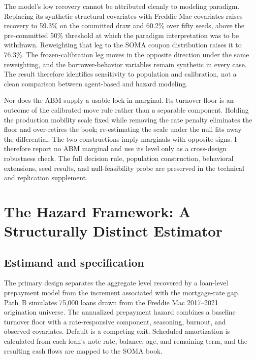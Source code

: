 \documentclass[12pt]{article}
\begin{document}
The model's low recovery cannot be attributed cleanly to modeling paradigm.
Replacing its synthetic structural covariates with Freddie Mac covariates raises
recovery to 59.3\% on the committed draw and 60.2\% over fifty seeds, above the
pre-committed 50\% threshold at which the paradigm interpretation was to be
withdrawn. Reweighting that leg to the SOMA coupon distribution raises it to
76.3\%. The frozen-calibration leg moves in the opposite direction under the
same reweighting, and the borrower-behavior variables remain synthetic in every
case. The result therefore identifies sensitivity to population and calibration,
not a clean comparison between agent-based and hazard modeling.

Nor does the ABM supply a usable lock-in marginal. Its turnover floor is an
outcome of the calibrated move rule rather than a separable component. Holding
the production mobility scale fixed while removing the rate penalty eliminates
the floor and over-retires the book; re-estimating the scale under the null
fits away the differential. The two constructions imply marginals with opposite
signs. I therefore report no ABM marginal and use its level only as a
cross-design robustness check. The full decision rule, population construction,
behavioral extensions, seed results, and null-feasibility probe are preserved
in the technical and replication supplement.

\section{The Hazard Framework: A Structurally Distinct Estimator}\label{sec:hazard}
\subsection{Estimand and specification}\label{sec:hazard-motivation}\label{sec:pathb}\label{eq:pathB}\label{eq:beta1}\label{eq:default}\label{tab:estimators}

The primary design separates the aggregate level recovered by a loan-level
prepayment model from the increment associated with the mortgage-rate gap.
Path~B simulates 75,000 loans drawn from the Freddie Mac 2017--2021 origination
universe. The annualized prepayment hazard combines a baseline turnover floor
with a rate-responsive component, seasoning, burnout, and observed covariates.
Default is a competing exit. Scheduled amortization is calculated from each
loan's note rate, balance, age, and remaining term, and the resulting cash flows
are mapped to the SOMA book.
\end{document}
